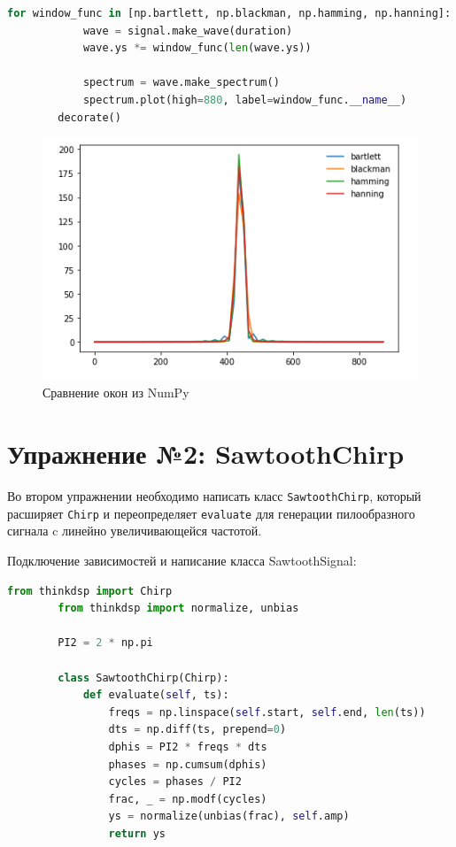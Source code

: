 \documentclass[a4paper, 14pt]{extarticle}
\begin{document}
    \begin{lstlisting}[language=Python, caption= Проверка окон и вывод графика,label={lst:lstlisting}]
        for window_func in [np.bartlett, np.blackman, np.hamming, np.hanning]:
            wave = signal.make_wave(duration)
            wave.ys *= window_func(len(wave.ys))

            spectrum = wave.make_spectrum()
            spectrum.plot(high=880, label=window_func.__name__)
        decorate()
    \end{lstlisting}

    \begin{figure}[H]
        \centering
        \includegraphics[width=0.8\linewidth]{compare_window}
        \caption{Сравнение окон из NumPy}
        \label{fig:compare_window}
    \end{figure}

    \newpage


    \section{Упражнение №2: SawtoothChirp}
    \label{sec:2_sawtooth_chirp}

    Во втором упражнении необходимо написать класс \texttt{SawtoothChirp}, который расширяет \texttt{Chirp} и переопределяет \texttt{evaluate} для генерации пилообразного сигнала c линейно увеличивающейся частотой.

    Подключение зависимостей и написание класса SawtoothSignal:

    \begin{lstlisting}[language=Python, caption= Класс SawtoothChirp, label={lst:sawtooth_chirp_code}]
        from thinkdsp import Chirp
        from thinkdsp import normalize, unbias

        PI2 = 2 * np.pi

        class SawtoothChirp(Chirp):
            def evaluate(self, ts):
                freqs = np.linspace(self.start, self.end, len(ts))
                dts = np.diff(ts, prepend=0)
                dphis = PI2 * freqs * dts
                phases = np.cumsum(dphis)
                cycles = phases / PI2
                frac, _ = np.modf(cycles)
                ys = normalize(unbias(frac), self.amp)
                return ys
    \end{lstlisting}
\end{document}
